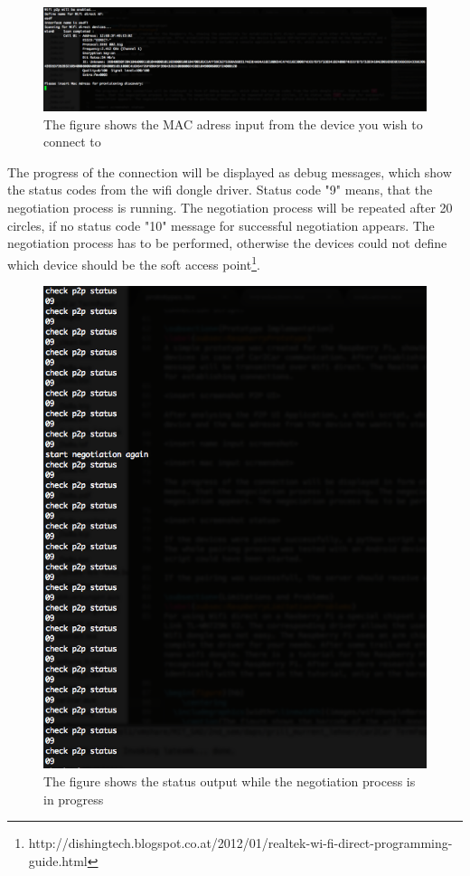 \begin{figure}[!hb]
	\centering
  \includegraphics[width=\linewidth]{images/enterMac_screenshot.eps}
	\caption{The figure shows the MAC adress input from the device you wish to connect to}
	\label{fig1}
\end{figure}

\noindent The progress of the connection will be displayed as debug messages, which show the status codes from the wifi dongle driver. Status code "9" means, that the negotiation process is running. The negotiation process will be repeated after 20 circles, if no status code "10" message for successful negotiation appears. The negotiation process has to be performed, otherwise the devices could not define which device should be the soft access point\footnote{http://dishingtech.blogspot.co.at/2012/01/realtek-wi-fi-direct-programming-guide.html}.

\begin{figure}[!hb]
	\centering
  \includegraphics[width=\linewidth]{images/status_screenshot.eps}
	\caption{The figure shows the status output while the negotiation process is in progress}
	\label{fig1}
\end{figure}

